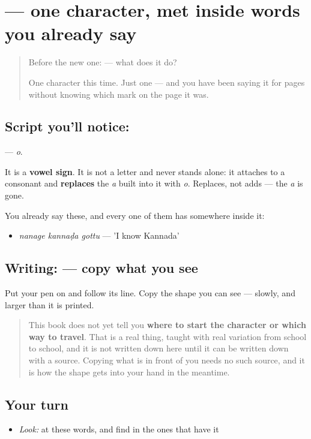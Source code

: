 \section[\texorpdfstring{\kn{ೊ} (o)}{ೊ (o)}]{ — one character, met inside words you already say}

\label{lesson:KA-S114-vowel-sign-o}



\begin{quote}
Before the new one:  — what does it do?

One character this time. Just one — and you have been saying it for pages without knowing which mark on the page it was.
\end{quote}

\subsection*{Script you'll notice: }
\textbf{} — \emph{o}.

It is a \textbf{vowel sign}. It is not a letter and never stands alone: it attaches to a consonant and \textbf{replaces} the \emph{a} built into it with \emph{o}. Replaces, not adds — the \emph{a} is gone.

You already say these, and every one of them has  somewhere inside it:

\begin{itemize}
\raggedright
  \item \textbf{  } \emph{nanage kannaḍa gottu} — 'I know Kannada'
\end{itemize}

\subsection*{Writing:  — copy what you see}
Put your pen on  and follow its line. Copy the shape you can see — slowly, and larger than it is printed.

\begin{quote}
This book does not yet tell you \textbf{where to start the character or which way to travel}. That is a real thing, taught with real variation from school to school, and it is not written down here until it can be written down with a source. Copying what is in front of you needs no such source, and it is how the shape gets into your hand in the meantime.
\end{quote}

\subsection*{Your turn}
\begin{itemize}
\raggedright
  \item \emph{Look:} at these words, and find  in the ones that have it
\end{itemize}

